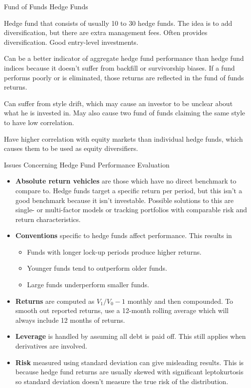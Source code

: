 \documentclass[../custom]{flashcards}
\begin{document}
\begin{flashcard}{Fund of Funds Hedge Funds}
    \begin{flushleft}
        Hedge fund that consists of usually 10 to 30 hedge funds. The idea is to add diversification, but there are extra management fees. Often provides diversification. Good entry-level investments.\newline

        Can be a better indicator of aggregate hedge fund performance than hedge fund indices because it doesn't suffer from backfill or survivorship biases. If a fund performs poorly or is eliminated, those returns are reflected in the fund of funds returns.\newline

        Can suffer from style drift, which may cause an investor to be unclear about what he is invested in. May also cause two fund of funds claiming the same style to have low correlation.\newline

        Have higher correlation with equity markets than individual hedge funds, which causes them to be used as equity diversifiers.
    \end{flushleft}
\end{flashcard}

\begin{flashcard}{Issues Concerning Hedge Fund Performance Evaluation}
    \begin{itemize}
        \item \textbf{Absolute return vehicles} are those which have no direct benchmark to compare to. Hedge funds target a specific return per period, but this isn't a good benchmark because it isn't investable. Possible solutions to this are single- or multi-factor models or tracking portfolios with comparable risk and return characteristics.
        \item \textbf{Conventions} specific to hedge funds affect performance. This results in
        \begin{itemize}
            \item Funds with longer lock-up periods produce higher returns.
            \item Younger funds tend to outperform older funds.
            \item Large funds underperform smaller funds.
        \end{itemize}
        \item \textbf{Returns} are computed as $V_1 / V_0 - 1$ monthly and then compounded. To smooth out reported returns, use a 12-month rolling average which will always include 12 months of returns.
        \item \textbf{Leverage} is handled by assuming all debt is paid off. This still applies when derivatives are involved. 
        \item \textbf{Risk} measured using standard deviation can give misleading results. This is because hedge fund returns are usually skewed with significant leptokurtosis so standard deviation doesn't measure the true risk of the distribution.
    \end{itemize}
\end{flashcard}
\end{document}
